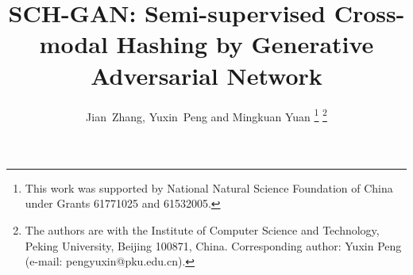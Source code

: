 \documentclass[journal]{IEEEtran}
\begin{document}
\title{SCH-GAN: Semi-supervised Cross-modal Hashing by Generative Adversarial Network}

\author{Jian~Zhang, Yuxin~Peng and Mingkuan Yuan
\thanks{This work was supported by National Natural Science Foundation of China
	under Grants 61771025 and 61532005.}
\thanks{The authors are with the Institute of Computer Science and Technology,
	Peking University, Beijing 100871, China. Corresponding author: Yuxin Peng
	(e-mail: pengyuxin@pku.edu.cn).}}















\maketitle
\end{document}
